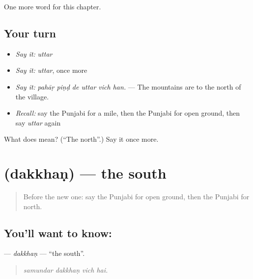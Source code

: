 \begin{grammarlens}[title={What you've built}]
One more word for this chapter.
\end{grammarlens}

\subsection*{Your turn}
\begin{itemize}
\raggedright
  \item \emph{Say it:} \emph{uttar}
  \item \emph{Say it:} \emph{uttar}, once more
  \item \emph{Say it:} \emph{pahāṛ piṇḍ de uttar vich han.} — The mountains are to the north of the village.
  \item \emph{Recall:} say the Punjabi for a mile, then the Punjabi for open ground, then say \emph{uttar} again
\end{itemize}

\begin{tcolorbox}[breakable,colback=teal!4,colframe=teal!35!black,title={Before you move on}]
What does  mean? (\textquotedblleft{}The north\textquotedblright{}.) Say it once more.
\end{tcolorbox}
\section[\texorpdfstring{\pa{ਦੱਖਣ} (dakkhaṇ)}{ਦੱਖਣ (dakkhaṇ)}]{ (dakkhaṇ) — the south}

\label{lesson:PA-C271-dakkhan}



\begin{quote}
Before the new one: say the Punjabi for open ground, then the Punjabi for north.
\end{quote}

\subsection*{You'll want to know: }
\textbf{} — \emph{dakkhaṇ} — \textquotedblleft{}the south\textquotedblright{}.

\begin{quote}
   
\end{quote}

\begin{quote}
\emph{samundar dakkhaṇ vich hai.}
\end{quote}

